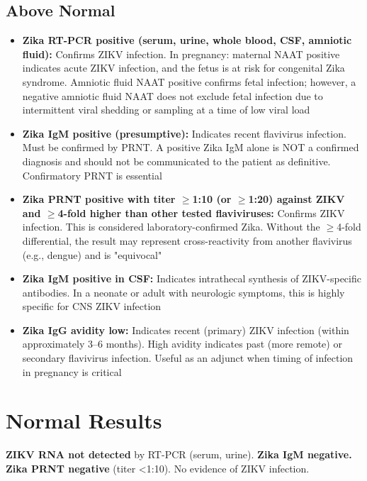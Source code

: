 \subsection*{Above Normal}
\begin{itemize}
  \item \textbf{Zika RT-PCR positive (serum, urine, whole blood, CSF, amniotic fluid):} Confirms ZIKV infection. In pregnancy: maternal NAAT positive indicates acute ZIKV infection, and the fetus is at risk for congenital Zika syndrome. Amniotic fluid NAAT positive confirms fetal infection; however, a negative amniotic fluid NAAT does not exclude fetal infection due to intermittent viral shedding or sampling at a time of low viral load
  \item \textbf{Zika IgM positive (presumptive):} Indicates recent flavivirus infection. Must be confirmed by PRNT. A positive Zika IgM alone is NOT a confirmed diagnosis and should not be communicated to the patient as definitive. Confirmatory PRNT is essential
  \item \textbf{Zika PRNT positive with titer $\geq$1:10 (or $\geq$1:20) against ZIKV and $\geq$4-fold higher than other tested flaviviruses:} Confirms ZIKV infection. This is considered laboratory-confirmed Zika. Without the $\geq$4-fold differential, the result may represent cross-reactivity from another flavivirus (e.g., dengue) and is "equivocal"
  \item \textbf{Zika IgM positive in CSF:} Indicates intrathecal synthesis of ZIKV-specific antibodies. In a neonate or adult with neurologic symptoms, this is highly specific for CNS ZIKV infection
  \item \textbf{Zika IgG avidity low:} Indicates recent (primary) ZIKV infection (within approximately 3--6 months). High avidity indicates past (more remote) or secondary flavivirus infection. Useful as an adjunct when timing of infection in pregnancy is critical
\end{itemize}

\section*{Normal Results}
\textbf{ZIKV RNA not detected} by RT-PCR (serum, urine). \textbf{Zika IgM negative.} \textbf{Zika PRNT negative} (titer <1:10). No evidence of ZIKV infection.

